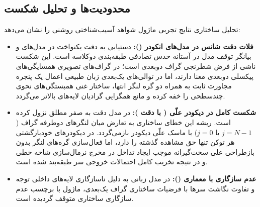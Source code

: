 \subsection{محدودیت‌ها و تحلیل شکست}
تحلیل ساختاری نتایج تجربی ماژول شواهد آسیب‌شناختی روشنی را نشان می‌دهد:
\begin{itemize}
    \item \textbf{فلات دقت شانس در مدل‌های انکودر ():} دستیابی به دقت یکنواخت  در مدل‌های  و  بیانگر توقف مدل در آستانه حدس تصادفی طبقه‌بندی دوکلاسه است. این شکست ناشی از فرض شطرنجی گراف دوبعدی است؛ در گراف‌های تصویری  همسایگی‌های پیکسلی دوبعدی معنا دارند، اما در توالی‌های یک‌بعدی زبان طبیعی اعمال یک پنجره مجاورت ثابت به همراه دو گره لنگر انتها، ساختار غنی همبستگی‌های نحوی چندسطحی را خفه کرده و مانع همگرایی گرادیان لایه‌های بالاتر می‌گردد.
    \item \textbf{شکست کامل در دیکودر علّی  ( با دقت ):} در مدل  دقت به صفر مطلق نزول کرده است. ریشه این خطای ساختاری به تعارض میان لنگرهای دوطرفه گراف ($j=N-1$ یا $j=0$) با ماسک علّی دیکودر بازمی‌گردد. در دیکودرهای خودبازگشتی هر توکن تنها حق مشاهده گذشته را دارد، اما فعال‌سازی گره‌های لنگر بدون بازطراحی علی سخت‌گیرانه موجب ایجاد تداخل در مخرج نرمال‌سازی شاخه خطی و در نتیجه تخریب کامل احتمالات خروجی سر طبقه‌بند شده است.
    \item \textbf{عدم سازگاری با معماری  ():} در مدل زبانی  به دلیل ناسازگاری لایه‌های داخلی توجه و تفاوت نگاشت سرها با فرضیات ساختاری گراف یک‌بعدی، ماژول با برچسب عدم سازگاری ساختاری متوقف گردیده است.
\end{itemize}
